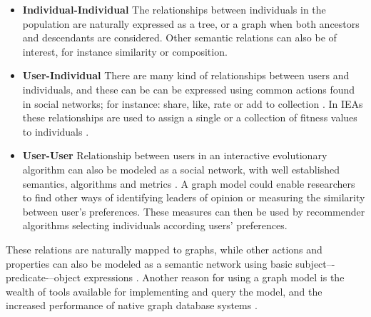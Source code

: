 \documentclass[conference]{IEEEtran}
\begin{document}
\begin{itemize}

  \item {\bf Individual-Individual} The relationships between individuals in the
  population %
are naturally expressed as a tree, or a graph when both ancestors 
  and descendants are considered. Other semantic relations can also be
  of interest, 
  for instance similarity or composition. %


  \item {\bf User-Individual} There are many kind of relationships
    between users and individuals, and these can be
  can be expressed using common actions found in social networks;
  for instance: share, like, rate or add to collection \cite{Prodromou:16:AS}. In IEAs these
  relationships are used to assign a single or a collection of
  fitness values to individuals \cite{garcia2013evospace}.   %

  \item {\bf User-User}
  Relationship between users in an interactive evolutionary algorithm can also be modeled 
  as a social network, with well established semantics, algorithms and metrics \cite{ahuja1993network}.
  A graph model could enable researchers to find other ways of identifying leaders of 
  opinion or measuring the similarity between user's preferences. 
  These measures can then be used by recommender algorithms selecting 
  individuals according users' preferences. 

\end{itemize}

These relations are naturally mapped to graphs, %
while other actions and 
properties can also be modeled as a semantic network using
basic subject–-predicate-–object expressions
\cite{Prud'hommeaux:14:RT}. %
Another reason for using a graph model %
is the wealth of tools available for
implementing and query the model, and the increased performance of
native graph database systems \cite{holzschuher2013performance,holzschuher2016querying}.
 
\end{document}
